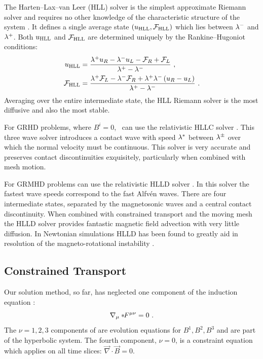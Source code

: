 The Harten--Lax--van Leer (HLL) solver is the simplest approximate Riemann solver and requires no other knowledge of the characteristic structure of the system \citep{HLL}.  It defines a single average state $(u_{\rm HLL}, \mathcal{F}_{\rm HLL})$ which lies between $\lambda^-$ and $\lambda^+$.  Both $u_{\rm HLL}$ and  $\mathcal{F}_{\rm HLL}$ are determined uniquely by the Rankine--Hugoniot conditions:
\begin{align}
	u_{\rm HLL} &= \frac{\lambda^+ u_R - \lambda^- u_L - \mathcal{F}_R + \mathcal{F}_L}{\lambda^+ - \lambda^-}\ , \\
	\mathcal{F}_{\rm HLL} &= \frac{\lambda^+ \mathcal{F}_L - \lambda^- \mathcal{F}_R +\lambda^+\lambda^-\left(u_R-u_L\right)}{\lambda^+ - \lambda^-}\ . \\
\end{align}
Averaging over the entire intermediate state, the HLL Riemann solver is the most diffusive and also the most stable.  

For GRHD problems, where $B^i = 0$, \grdisco\ can use the relativistic HLLC solver \citep{Toro94, Mignone05}.  This three wave solver introduces a contact wave with speed $\lambda^*$ between $\lambda^\pm$ over which the normal velocity must be continuous.  This solver is very accurate and preserves contact discontinuities exquisitely, particularly when combined with mesh motion.

For GRMHD problems \grdisco can use the relativistic HLLD solver \citep{HLLD,Mignone09}.  In this solver the fastest wave speeds correspond to the fast Alfv\'{e}n waves.  There are four intermediate states, separated by the magnetosonic waves and a central contact discontinuity.  When combined with constrained transport and the moving mesh the HLLD solver provides fantastic magnetic field advection with very little diffusion.  In Newtonian simulations HLLD has been found to greatly aid in resolution of the magneto-rotational instability \citep{Sorathia12}.

\subsection{Constrained Transport}

Our solution method, so far, has neglected one component of the induction equation :
\begin{equation}
	\nabla_\mu *\!\! F^{\mu\nu} = 0\ .
\end{equation}
The $\nu=1,2,3$ components of  are evolution equations for $B^1, B^2, B^3$ and are part of the hyperbolic system.  The fourth component, $\nu=0$, is a constraint equation which applies on all time slices: $\vec{\nabla}\cdot \vec{B} = 0$.


